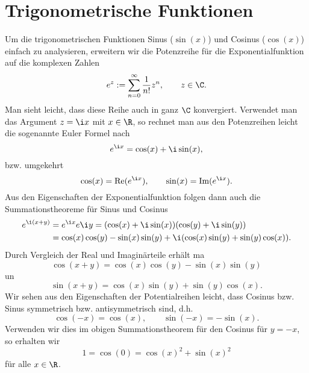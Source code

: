 \documentclass[letterpaper,10pt,english]{jupyterBook}
\begin{document}
\section{Trigonometrische Funktionen}
\label{\detokenize{stetigkeit/trig:trigonometrische-funktionen}}\label{\detokenize{stetigkeit/trig::doc}}
Um die trigonometrischen Funktionen Sinus (\(\sin(x)\)) und Cosinus (\(\cos(x)\)) einfach zu analysieren, erweitern wir die Potenzreihe für die Exponentialfunktion auf die komplexen Zahlen
\begin{equation*}
 e^z:= \sum_{n=0}^\infty \frac{1}{n!} z^n, \qquad z \in \C.
\end{equation*}
Man sieht leicht, dass diese Reihe auch in ganz \(\C\) konvergiert. Verwendet man das Argument \(z=\i x\) mit \(x \in \R\), so rechnet man aus den Potenzreihen leicht die sogenannte Euler Formel nach
\begin{equation*}
 e^{\i x} = \cos(x) + \i \sin(x),
\end{equation*}
bzw. umgekehrt
\begin{equation*}
 \cos(x) = \text{Re}(e^{\i x}), \qquad \sin(x) = \text{Im}(e^{\i x}).
\end{equation*}
Aus den Eigenschaften der Exponentialfunktion folgen dann auch die Summationstheoreme für Sinus und Cosinus
\begin{align*}
e^{\i (x+y)} &= e^{\i x}e{\i y} = (\cos(x) + \i \sin(x)) (\cos(y) + \i \sin(y))  \\
&= \cos(x) \cos(y) - \sin(x) \sin(y) + \i ( \cos(x) \sin(y) + \sin(y) \cos(x)).
\end{align*}
Durch Vergleich der Real  und Imaginärteile erhält ma
\begin{equation*}
 \cos(x+y) = \cos(x) \cos(y) - \sin(x) \sin(y)
\end{equation*}
un
\begin{equation*}
 \sin(x+y) =  \cos(x) \sin(y) + \sin(y) \cos(x).
\end{equation*}
Wir sehen aus den Eigenschaften der Potentialreihen leicht, dass Cosinus bzw. Sinus symmetrisch bzw. antisymmetrisch sind, d.h.
\begin{equation*}
 \cos(-x) = \cos(x)  , \qquad \sin(-x) = -\sin(x) .
\end{equation*}
Verwenden wir dies im obigen Summationstheorem für den Cosinus für \(y=-x\), so erhalten wir
\begin{equation*}
 1 = \cos(0) = \cos(x)^2 + \sin(x)^2
\end{equation*}
für alle \(x \in \R\).
\end{document}
